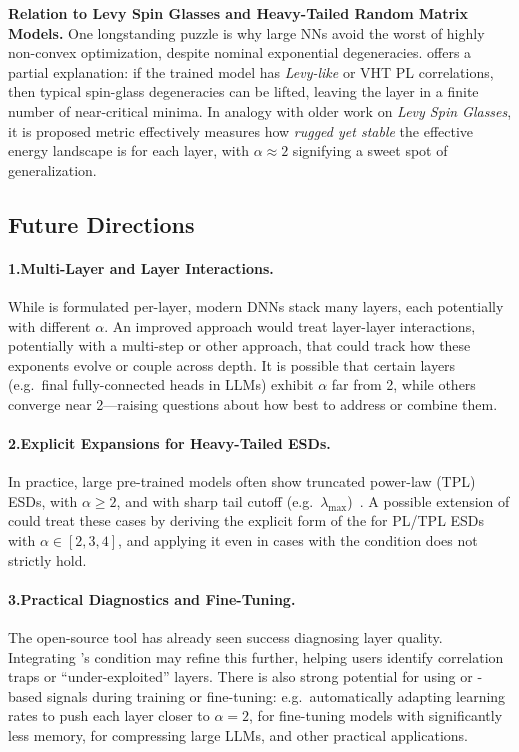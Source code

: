 \vspace{1em}
\noindent
\textbf{Relation to Levy Spin Glasses and Heavy-Tailed Random Matrix Models.}
One longstanding puzzle is why large NNs avoid the worst of highly non-convex optimization, despite nominal 
exponential degeneracies. \SETOL offers a partial explanation: if the trained model has \emph{Levy-like} or VHT
PL correlations, then typical spin-glass degeneracies can be lifted, leaving the layer in a finite number 
of near-critical minima. In analogy with older work on \emph{Levy Spin Glasses}\cite{Bouchaud1998},  it is
proposed  \WW \ALPHA  metric effectively measures how \emph{rugged yet stable} the
effective energy landscape is for each layer, with $\alpha\approx 2$ signifying a sweet spot of \Ideal generalization.

\subsection{Future Directions}

\paragraph{1.\quad Multi-Layer   \ERG and Layer Interactions.}
While \SETOL is formulated per-layer, modern DNNs stack many layers, each potentially with different $\alpha$. 
An improved approach would treat layer-layer interactions, potentially with a multi-step   \ERG or other
approach, that could track how these exponents evolve or couple across depth. It is possible 
that certain layers (e.g.\ final fully-connected heads in LLMs) exhibit $\alpha$ far from 2, while others 
converge near 2---raising questions about how best to address or combine them.

\paragraph{2.\quad Explicit \RTransform Expansions for Heavy-Tailed  ESDs.}
In practice, large pre-trained models often show truncated power-law (TPL) ESDs, with $\alpha \ge 2$,
and with sharp tail cutoff  (e.g.\ $\lambda_{\max}$)~\cite{YTHx22_TR,YTHx23_KDD}.
A possible extension of \SETOL could treat these cases by deriving the explicit form
of the \RTransform for PL/TPL ESDs with $\alpha\in[2,3,4]$, and applying it even in
cases with the \TRACELOG condition does not strictly hold.

\paragraph{3.\quad Practical Diagnostics and Fine-Tuning.}
The open-source \WW tool has already seen success diagnosing layer quality. Integrating \SETOL’s 
\TRACELOG condition may refine this further, helping users identify correlation traps or “under-exploited” 
layers. There is also strong potential for using \ALPHA or \TRACELOG-based signals during training or 
fine-tuning: e.g.\ automatically adapting learning rates to push each layer closer to $\alpha=2$,
for fine-tuning models with significantly less memory\cite{Qing2024AlphaLoRA},
for compressing large LLMs\cite{alphapruning_NEURIPS2024}, and other practical applications.

